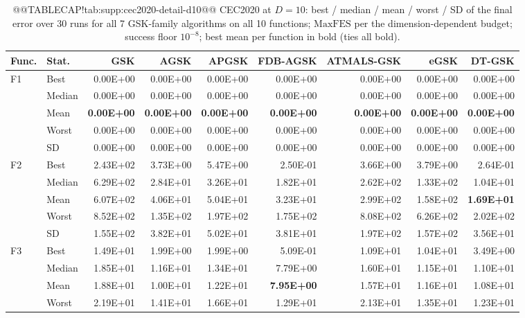 \documentclass[10pt,a4paper]{article}
\newcommand{\bestval}[1]{\textbf{#1}}
\begin{document}
\begin{table}[p]
\caption{@@TABLECAP!tab:supp:cec2020-detail-d10@@ CEC2020 at $D = 10$: best / median / mean / worst / SD of
the final error over 30 runs for all 7 GSK-family algorithms
on all 10 functions;
$\mathrm{MaxFES}$ per the dimension-dependent budget; success floor
$10^{-8}$; best mean per function in bold (ties all bold).
}\label{tab:supp:cec2020-detail-d10}


\zebra
\begin{tabular}{llrrrrrrr}
\toprule
\textbf{Func.} & \textbf{Stat.} & \textbf{GSK} & \textbf{AGSK} & \textbf{APGSK} & \textbf{FDB-AGSK} & \textbf{ATMALS-GSK} & \textbf{eGSK} & \textbf{DT-GSK} \\
\midrule
F1 & Best & 0.00E+00 & 0.00E+00 & 0.00E+00 & 0.00E+00 & 0.00E+00 & 0.00E+00 & 0.00E+00 \\
 & Median & 0.00E+00 & 0.00E+00 & 0.00E+00 & 0.00E+00 & 0.00E+00 & 0.00E+00 & 0.00E+00 \\
 & Mean & \bestval{0.00E+00} & \bestval{0.00E+00} & \bestval{0.00E+00} & \bestval{0.00E+00} & \bestval{0.00E+00} & \bestval{0.00E+00} & \bestval{0.00E+00} \\
 & Worst & 0.00E+00 & 0.00E+00 & 0.00E+00 & 0.00E+00 & 0.00E+00 & 0.00E+00 & 0.00E+00 \\
 & SD & 0.00E+00 & 0.00E+00 & 0.00E+00 & 0.00E+00 & 0.00E+00 & 0.00E+00 & 0.00E+00 \\
\midrule
F2 & Best & 2.43E+02 & 3.73E+00 & 5.47E+00 & 2.50E-01 & 3.66E+00 & 3.79E+00 & 2.64E-01 \\
 & Median & 6.29E+02 & 2.84E+01 & 3.26E+01 & 1.82E+01 & 2.62E+02 & 1.33E+02 & 1.04E+01 \\
 & Mean & 6.07E+02 & 4.06E+01 & 5.04E+01 & 3.23E+01 & 2.99E+02 & 1.58E+02 & \bestval{1.69E+01} \\
 & Worst & 8.52E+02 & 1.35E+02 & 1.97E+02 & 1.75E+02 & 8.08E+02 & 6.26E+02 & 2.02E+02 \\
 & SD & 1.55E+02 & 3.82E+01 & 5.02E+01 & 3.81E+01 & 1.97E+02 & 1.57E+02 & 3.56E+01 \\
\midrule
F3 & Best & 1.49E+01 & 1.99E+00 & 1.99E+00 & 5.09E-01 & 1.09E+01 & 1.04E+01 & 3.49E+00 \\
 & Median & 1.85E+01 & 1.16E+01 & 1.34E+01 & 7.79E+00 & 1.60E+01 & 1.15E+01 & 1.10E+01 \\
 & Mean & 1.88E+01 & 1.00E+01 & 1.22E+01 & \bestval{7.95E+00} & 1.57E+01 & 1.16E+01 & 1.08E+01 \\
 & Worst & 2.19E+01 & 1.41E+01 & 1.66E+01 & 1.29E+01 & 2.13E+01 & 1.35E+01 & 1.23E+01 \\

\end{tabular}
\end{table}
\end{document}
